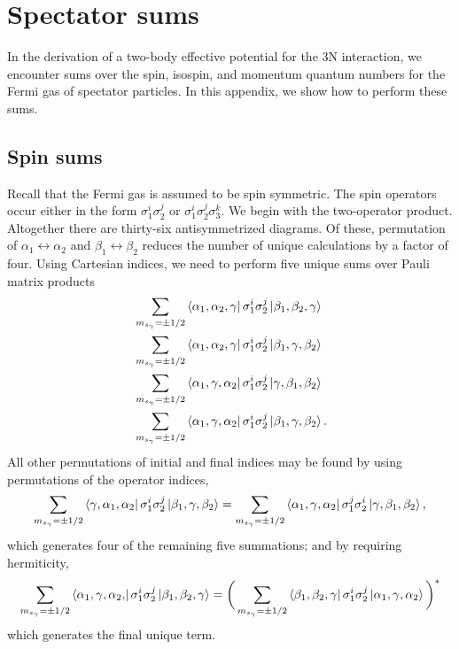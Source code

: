 \chapter{Spectator sums}

In the derivation of a two-body effective potential for the 3N interaction, we encounter sums over the spin, isospin, and momentum quantum numbers for the Fermi gas of spectator particles. In this appendix, we show how to perform these sums.

\section{Spin sums}
Recall that the Fermi gas is assumed to be spin symmetric. The spin operators occur either in the form $\sigma_1^i\sigma_2^j$ or $\sigma_1^i\sigma_2^j\sigma_3^k$. We begin with the two-operator product. Altogether there are thirty-six antisymmetrized diagrams. Of these, permutation of $\alpha_1\leftrightarrow \alpha_2$ and $\beta_1\leftrightarrow \beta_2$ reduces the number of unique calculations by a factor of four. Using Cartesian indices, we need to perform five unique sums over Pauli matrix products
\begin{align}
&\sum_{m_{s_\gamma}=\pm1/2} \bra{\alpha_1,\alpha_2, \gamma } \sigma_1^i\sigma_2^j \ket{\beta_1, \beta_2, \gamma} \label{eq:2sigma33}\\
&\sum_{m_{s_\gamma}=\pm1/2} \bra{\alpha_1,\alpha_2, \gamma } \sigma_1^i\sigma_2^j \ket{\beta_1,  \gamma, \beta_2 } \label{eq:2sigma32}\\
 &\sum_{m_{s_\gamma}=\pm1/2} \bra{\alpha_1, \gamma, \alpha_2 } \sigma_1^i\sigma_2^j \ket{\gamma, \beta_1, \beta_2 } \label{eq:2sigma21}\\
 &\sum_{m_{s_\gamma}=\pm1/2} \bra{\alpha_1, \gamma, \alpha_2 } \sigma_1^i\sigma_2^j \ket{\beta_1, \gamma, \beta_2 }. \label{eq:2sigma22}
\end{align}
All other permutations of initial and final indices may be found by using permutations of the operator indices, 
\begin{equation}
\sum_{m_{s_\gamma}=\pm1/2} \bra{ \gamma, \alpha_1, \alpha_2 } \sigma_1^i\sigma_2^j \ket{\beta_1, \gamma, \beta_2 } = \sum_{m_{s_\gamma}=\pm1/2} \bra{\alpha_1, \gamma, \alpha_2 } \sigma_1^j\sigma_2^i \ket{\gamma, \beta_1, \beta_2 },
\end{equation}
which generates four  of the remaining five summations; and by requiring hermiticity,
\begin{equation}
\sum_{m_{s_\gamma}=\pm1/2} \bra{\alpha_1, \gamma,\alpha_2, } \sigma_1^i\sigma_2^j \ket{\beta_1,  \beta_2, \gamma }=
\bigg(\sum_{m_{s_\gamma}=\pm1/2} \bra{\beta_1, \beta_2, \gamma } \sigma_1^i\sigma_2^j \ket{\alpha_1, \gamma, \alpha_2 }\bigg)^*
\end{equation}
which generates the final unique term.


